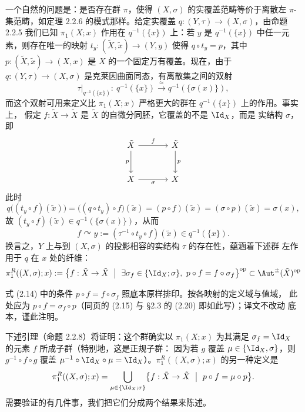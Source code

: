一个自然的问题是：是否存在群 $\pi$，使得 $(X,\sigma)$ 的实覆盖范畴等价于离散左
$\pi$-集范畴，如定理 2.2.6 的模式那样。给定实覆盖 $q:(Y,\tau)\to(X,\sigma)$，由命题
2.2.5 我们已知 $\pi_1(X;x)$ 作用在 $q^{-1}(\{x\})$ 上：若 $y$ 是
$q^{-1}(\{x\})$ 中任一元素，则存在唯一的映射
$t_y:(\tilde X,\tilde x)\to(Y,y)$ 使得 $q\circ t_y=p$，其中
$p:(\tilde X,\tilde x)\to(X,x)$ 是 $X$ 的一个固定万有覆盖。现在，由于
$q:(Y,\tau)\to(X,\sigma)$ 是克莱因曲面同态，有离散集之间的双射
\[
\tau|_{q^{-1}(\{x\})}:\ q^{-1}(\{x\})\xrightarrow{\ \simeq\ }q^{-1}(\{\sigma(x)\}),
\]
而这个双射可用来定义比 $\pi_1(X;x)$ 严格更大的群在 $q^{-1}(\{x\})$ 上的作用。事实上，
假定 $f:\tilde X\to\tilde X$ 是 $\tilde X$ 的自微分同胚，它覆盖的不是 $\Id_X$，而是
实结构 $\sigma$，即
\[
\begin{tikzcd}[column sep=large, row sep=large]
\tilde X \arrow[r, "f"] \arrow[d, "p"'] & \tilde X \arrow[d, "p"]\\
X \arrow[r, "\sigma"'] & X
\end{tikzcd}
\]
此时
\[
q\bigl((t_y\circ f)(\tilde x)\bigr)
=\bigl((q\circ t_y)\circ f\bigr)(\tilde x)
=(p\circ f)(\tilde x)=(\sigma\circ p)(\tilde x)=\sigma(x),
\]
故 $(t_y\circ f)(\tilde x)\in q^{-1}(\{\sigma(x)\})$，从而
\begin{equation}\label{eq:2.13}
f\curvearrowright y:=(\tau^{-1}\circ t_y\circ f)(\tilde x)\in q^{-1}(\{x\}).
\end{equation}
换言之，$Y$ 上与到 $(X,\sigma)$ 的投影相容的实结构 $\tau$ 的存在性，蕴涵着下述群
左作用于 $q$ 在 $x$ 处的纤维：
\begin{equation}\label{eq:2.14}
\pi^R_1((X,\sigma);x):=
\bigl\{f:\tilde X\to\tilde X\ \bigm|\ \exists\sigma_f\in\{\Id_X;\sigma\},\
p\circ f=f\circ\sigma_f\bigr\}^{\mathrm{op}}
\subset\Aut^{\pm}(\tilde X)^{\mathrm{op}}
\end{equation}
\begin{annote}
式 (2.14) 中的条件 $p\circ f=f\circ\sigma_f$ 照底本原样排印。按各映射的定义域与值域，
此处应为 $p\circ f=\sigma_f\circ p$（同页的 (2.15) 与 §2.3 的 (2.20) 即如此写）；译文不改动
底本，谨此注明。
\end{annote}

下述引理（命题 2.2.8）将证明：这个群确实以
$\pi_1(X;x)$ 为其满足 $\sigma_f=\Id_X$ 的元素 $f$ 所成子群（特别地，这是正规子群：
因为若 $g$ 覆盖 $\mu\in\{\Id_X,\sigma\}$，则 $g^{-1}\circ f\circ g$ 覆盖
$\mu^{-1}\circ\Id_X\circ\mu=\Id_X$）。$\pi^R_1((X,\sigma);x)$ 的另一种定义是
\begin{equation}\label{eq:2.15}
\pi^R_1((X,\sigma);x)=\bigcup_{\mu\in\{\Id_X;\sigma\}}
\bigl\{f:\tilde X\to\tilde X\ \bigm|\ p\circ f=\mu\circ p\bigr\}.
\end{equation}
需要验证的有几件事，我们把它们分成两个结果来陈述。
